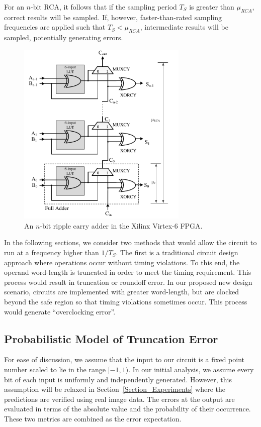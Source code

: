 \documentclass[prodmode,acmtrets]{acmsmall} %
\begin{document}
For an $n$-bit RCA, it follows that if the sampling period $T_S$ is greater than $\mu_{RCA}$, correct results will be sampled. If, however, faster-than-rated sampling frequencies are applied such that $T_S<\mu_{RCA}$, intermediate results will be sampled, potentially generating errors.

\begin{figure}[t]
  \centering
  \includegraphics[width=3.2in]{./Figures/FastCarryLogic.pdf}
  \caption{An $n$-bit ripple carry adder in the Xilinx Virtex-6 FPGA.}
  \label{FPGA adder}
\end{figure}

In the following sections, we consider two methods that would allow the circuit to run at a frequency higher than $1/{T_S}$. The first is a traditional circuit design approach where operations occur without timing violations. To this end, the operand word-length is truncated in order to meet the timing requirement. This process would result in truncation or roundoff error. In our proposed new design scenario, circuits are implemented with greater word-length, but are clocked beyond the safe region so that timing violations sometimes occur. This process would generate ``overclocking error''.

\subsection{Probabilistic Model of Truncation Error}\label{section_RCA_TruncationError}
For ease of discussion, we assume that the input to our circuit is a fixed point number scaled to lie in the range $[-1,1)$. In our initial analysis, we assume every bit of each input is uniformly and independently generated. However, this assumption will be relaxed in Section~\ref{Section_Experiments} where the predictions are verified using real image data. The errors at the output are evaluated in terms of the absolute value and the probability of their occurrence. These two metrics are combined as the error expectation.
\end{document}
